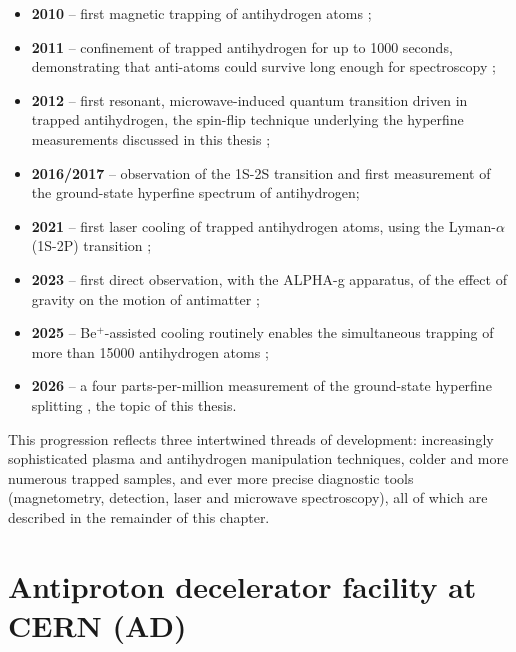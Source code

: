 \begin{itemize}
\item \textbf{2010} -- first magnetic trapping of antihydrogen atoms \cite{ALPHA:2010oyp};
\item \textbf{2011} -- confinement of trapped antihydrogen for up to 1000 seconds, demonstrating that anti-atoms could survive long enough for spectroscopy \cite{Amole:2011cvt};
\item \textbf{2012} -- first resonant, microwave-induced quantum transition driven in trapped antihydrogen, the spin-flip technique underlying the hyperfine measurements discussed in this thesis \cite{ALPHA:2012kaf};
\item \textbf{2016/2017} -- observation of the 1S-2S transition \cite{Ahmadi:2016fyz} and first measurement of the ground-state hyperfine spectrum \cite{ALPHA:2017fsh} of antihydrogen;
\item \textbf{2021} -- first laser cooling of trapped antihydrogen atoms, using the Lyman-$\alpha$ (1S-2P) transition \cite{Baker:2021ncj};
\item \textbf{2023} -- first direct observation, with the ALPHA-g apparatus, of the effect of gravity on the motion of antimatter \cite{Anderson:2023wnq};
\item \textbf{2025} -- Be$^{+}$-assisted cooling routinely enables the simultaneous trapping of more than 15000 antihydrogen atoms \cite{Akbari:2025mli};
\item \textbf{2026} -- a four parts-per-million measurement of the ground-state hyperfine splitting \cite{ALPHA:2026lbu}, the topic of this thesis.
\end{itemize}

This progression reflects three intertwined threads of development: increasingly sophisticated plasma and antihydrogen manipulation techniques, colder and more numerous trapped samples, and ever more precise diagnostic tools (magnetometry, detection, laser and microwave spectroscopy), all of which are described in the remainder of this chapter.

\section{Antiproton decelerator facility at CERN (AD)}


